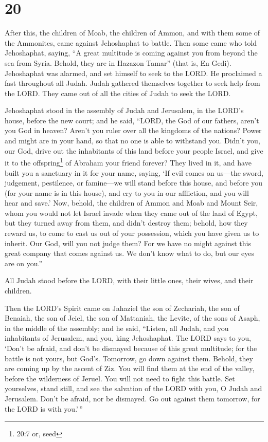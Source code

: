 \hypertarget{section-19}{%
\section{20}\label{section-19}}

 After this, the children of Moab, the children of Ammon,
and with them some of the Ammonites, came against Jehoshaphat to battle.
 Then some came who told Jehoshaphat, saying, ``A great
multitude is coming against you from beyond the sea from Syria. Behold,
they are in Hazazon Tamar'' (that is, En Gedi).  Jehoshaphat
was alarmed, and set himself to seek to the LORD. He proclaimed a fast
throughout all Judah.  Judah gathered themselves together to
seek help from the LORD. They came out of all the cities of Judah to
seek the LORD.

 Jehoshaphat stood in the assembly of Judah and Jerusalem,
in the LORD's house, before the new court;  and he said,
``LORD, the God of our fathers, aren't you God in heaven? Aren't you
ruler over all the kingdoms of the nations? Power and might are in your
hand, so that no one is able to withstand you.  Didn't you,
our God, drive out the inhabitants of this land before your people
Israel, and give it to the offspring\footnote{20:7 or, seed} of Abraham
your friend forever?  They lived in it, and have built you a
sanctuary in it for your name, saying,  `If evil comes on
us---the sword, judgement, pestilence, or famine---we will stand before
this house, and before you (for your name is in this house), and cry to
you in our affliction, and you will hear and save.'  Now,
behold, the children of Ammon and Moab and Mount Seir, whom you would
not let Israel invade when they came out of the land of Egypt, but they
turned away from them, and didn't destroy them;  behold,
how they reward us, to come to cast us out of your possession, which you
have given us to inherit.  Our God, will you not judge
them? For we have no might against this great company that comes against
us. We don't know what to do, but our eyes are on you.''

 All Judah stood before the LORD, with their little ones,
their wives, and their children.

 Then the LORD's Spirit came on Jahaziel the son of
Zechariah, the son of Benaiah, the son of Jeiel, the son of Mattaniah,
the Levite, of the sons of Asaph, in the middle of the assembly;
 and he said, ``Listen, all Judah, and you inhabitants of
Jerusalem, and you, king Jehoshaphat. The LORD says to you, `Don't be
afraid, and don't be dismayed because of this great multitude; for the
battle is not yours, but God's.  Tomorrow, go down against
them. Behold, they are coming up by the ascent of Ziz. You will find
them at the end of the valley, before the wilderness of Jeruel.
 You will not need to fight this battle. Set yourselves,
stand still, and see the salvation of the LORD with you, O Judah and
Jerusalem. Don't be afraid, nor be dismayed. Go out against them
tomorrow, for the LORD is with you.'\,''

